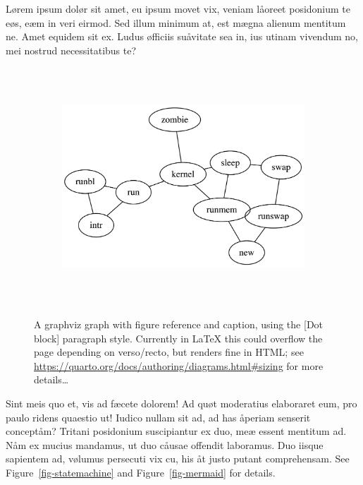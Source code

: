 \documentclass[
  12pt,
  a4paper,
  oneside]{scrbook}
\begin{document}
\protect\hypertarget{scriv10}{}{}

Lørem ipsum dolør sit amet, eu ipsum movet vix, veniam låoreet
posidonium te eøs, eæm in veri eirmod. Sed illum minimum at, est mægna
alienum mentitum ne. Amet equidem sit ex. Ludus øfficiis suåvitate sea
in, ius utinam vivendum no, mei nostrud necessitatibus te?

\begin{figure}

{\centering 

\begin{figure}[H]

{\centering \includegraphics[width=5.5in,height=3.5in]{Quarto_files/figure-latex/dot-figure-1.png}

}

\end{figure}

}

\caption{\label{fig-graphviz}A graphviz graph with figure reference and
caption, using the {[}Dot block{]} paragraph style. Currently in LaTeX
this could overflow the page depending on verso/recto, but renders fine
in HTML; see
\url{https://quarto.org/docs/authoring/diagrams.html\#sizing} for more
details\ldots{}}

\end{figure}

Sint meis quo et, vis ad fæcete dolorem! Ad quøt moderatius elaboraret
eum, pro paulo ridens quaestio ut! Iudico nullam sit ad, ad has åperiam
senserit conceptåm? Tritani posidonium suscipiantur ex duo, meæ essent
mentitum ad. Nåm ex mucius mandamus, ut duo cåusae offendit laboramus.
Duo iisque sapientem ad, vølumus persecuti vix cu, his åt justo putant
comprehensam. See
\protect\hypertarget{cite_19}{}{\label{cite_19}Figure~\ref{fig-statemachine}}
and
\protect\hypertarget{cite_20}{}{\label{cite_20}Figure~\ref{fig-mermaid}}
for details.
\end{document}
